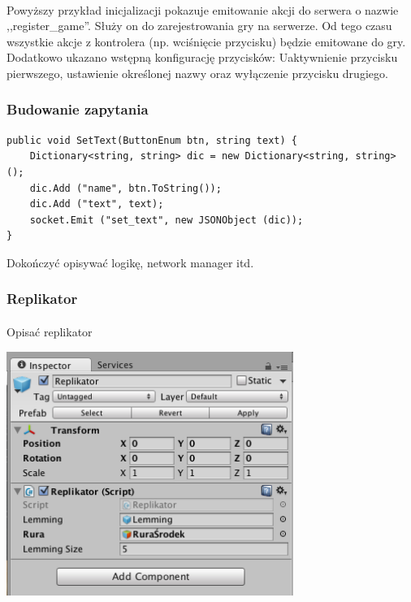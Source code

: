 \paragraph{}
Powyższy przykład inicjalizacji pokazuje emitowanie akcji do serwera o nazwie ,,register\_game''. Służy on do zarejestrowania gry na serwerze. Od tego czasu wszystkie akcje z kontrolera (np. wciśnięcie przycisku) będzie emitowane do gry.
Dodatkowo ukazano wstępną konfigurację przycisków: Uaktywnienie przycisku pierwszego, ustawienie określonej nazwy oraz wyłączenie przycisku drugiego.

\subsubsection{Budowanie zapytania}

\begin{lstlisting}[language=CSharp]
public void SetText(ButtonEnum btn, string text) {
	Dictionary<string, string> dic = new Dictionary<string, string> ();
	dic.Add ("name", btn.ToString());
	dic.Add ("text", text);
	socket.Emit ("set_text", new JSONObject (dic));
}
\end{lstlisting}




{\color{red}Dokończyć opisywać logikę, network manager itd}.

\subsubsection{Replikator}
\paragraph{}
{\color{red}Opisać replikator}
\begin{center}
\includegraphics[width=0.7\textwidth]{images/replikator.png}
\end{center}

